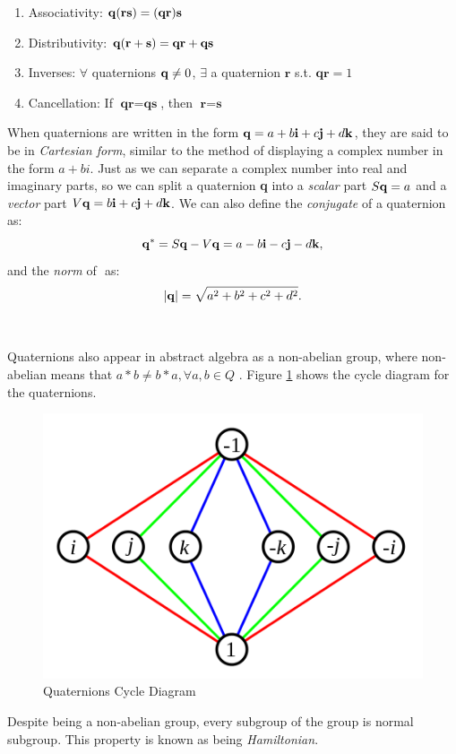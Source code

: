 \begin{thm}
\label{thm:mult}
\begin{enumerate} \textit{Properties of Quaternion Multiplication}
	For quaternions \qq, \qr, \qs, the following hold:
	\item Associativity: $\text{\textbf{q}} ( \textbf{r} \textbf{s}) = (\textbf{q} \textbf{r}) \textbf{s}$
	\item Distributivity: $\text{\textbf{q}} (\textbf{r} + \textbf{s}) = \textbf{q} \textbf{r} + \textbf{q} \textbf{s}$
	\item Inverses: $\forall$ quaternions $\text{\textbf{q}} \neq 0$, $\exists$ a quaternion $\textbf{r}$ s.t. $\textbf{qr} = 1$
	\item Cancellation: If $\textbf{qr}=\textbf{qs}$, then $\textbf{r} = \textbf{s}$
\end{enumerate}

\end{thm}

When quaternions are written in the form $\text{\textbf{q}} = a + b\text{\textbf{i}} + c\text{\textbf{j}} + d\text{\textbf{k}}$, they are said to be in \textit{Cartesian form}, similar to the method of displaying a complex number in the form $a + bi$.
Just as we can separate a complex number into real and imaginary parts, so we can split a quaternion \textbf{q} into a \textit{scalar} part $S\text{\textbf{q}} = a$ and a \textit{vector} part $V\text{\textbf{q}} = b\text{\textbf{i}} + c\text{\textbf{j}} + d\text{\textbf{k}}$.
We can also define the \textit{conjugate} of a quaternion as: $$ \text{\textbf{q}}^* = S\text{\textbf{q}} - V\text{\textbf{q}} = a - b\text{\textbf{i}} - c\text{\textbf{j}} - d\text{\textbf{k}},$$ and the \textit{norm} of \qq$ $ as:$$ \lvert\text{\textbf{q}}\rvert = \sqrt{a^2 + b^2 + c^2 + d^2}.$$
\\ \\
Quaternions also appear in abstract algebra as a non-abelian group, where non-abelian means that $a * b \neq b * a, \forall a,b \in Q$ \cite{elements}.
Figure \ref{fig:cycle} shows the cycle diagram for the quaternions.

\begin{figure}[H]
\centering
\includegraphics[width = .75\textwidth]{Figures/cycle.png}
\caption{Quaternions Cycle Diagram}
\label{fig:cycle}
\end{figure}
Despite being a non-abelian group, every subgroup of the group is normal subgroup.
This property is known as being \textit{Hamiltonian}.

